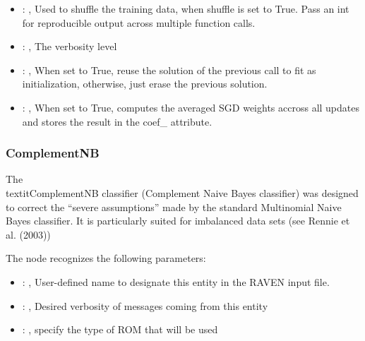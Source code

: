 \begin{itemize}
    \item {}: ,
      Used to shuffle the training data, when shuffle is set to
      True. Pass an int for reproducible output across multiple function calls.

    \item {}: ,
      The verbosity level

    \item {}: ,
      When set to True, reuse the solution of the previous call
      to fit as initialization, otherwise, just erase the previous solution.

    \item {}: ,
      When set to True, computes the averaged SGD weights accross
      all updates and stores the result in the coef\_ attribute.
  \end{itemize}


\subsubsection{ComplementNB}
  The \\textit{ComplementNB} classifier (Complement Naive Bayes classifier) was designed to correct
  the ``severe assumptions'' made by the standard Multinomial Naive Bayes classifier.
  It is particularly suited for imbalanced data sets (see Rennie et al. (2003))

  The  node recognizes the following parameters:
    \begin{itemize}
      \item {}: ,
        User-defined name to designate this entity in the RAVEN input file.
      \item {}: ,
        Desired verbosity of messages coming from this entity
      \item {}: ,
        specify the type of ROM that will be used
  \end{itemize}

